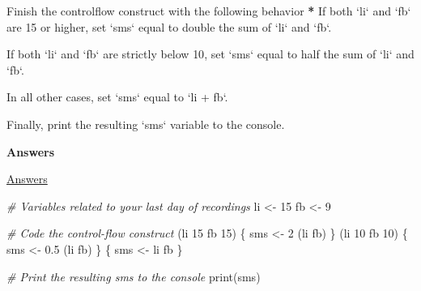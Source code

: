 \documentclass[]{article}
\newcommand{\hlnum}[1]{\textcolor[rgb]{0.816,0.125,0.439}{#1}}%
\newcommand{\hlstr}[1]{\textcolor[rgb]{0.251,0.627,0.251}{#1}}%
\newcommand{\hlcom}[1]{\textcolor[rgb]{0.502,0.502,0.502}{\textit{#1}}}%
\newcommand{\hlstd}[1]{\textcolor[rgb]{0.251,0.251,0.251}{#1}}%
\newcommand{\hlkwc}[1]{\textcolor[rgb]{0.251,0.251,0.251}{#1}}%
\newcommand{\hlkwd}[1]{\textcolor[rgb]{0.878,0.439,0.125}{#1}}%
\newenvironment{Shaded}{\begin{myshaded}}{\end{myshaded}}
\newcommand{\KeywordTok}[1]{\hlkwd{#1}}
\newcommand{\DataTypeTok}[1]{\hlkwc{#1}}
\newcommand{\DecValTok}[1]{\hlnum{#1}}
\newcommand{\FloatTok}[1]{\hlnum{#1}}
\newcommand{\StringTok}[1]{\hlstr{#1}}
\newcommand{\CommentTok}[1]{\hlcom{#1}}
\newcommand{\ErrorTok}[1]{\textbf{{#1}}}
\newcommand{\NormalTok}[1]{\hlstd{#1}}
\begin{document}
\begin{Shaded}
\begin{Highlighting}[]
\NormalTok{Finish the control}\OperatorTok{-}\NormalTok{flow construct with the following behavior}\OperatorTok{:}
\StringTok{  }
\StringTok{  }\ErrorTok{*}\StringTok{ }\NormalTok{If both }\StringTok{`}\DataTypeTok{li}\StringTok{`}\NormalTok{ and }\StringTok{`}\DataTypeTok{fb}\StringTok{`}\NormalTok{ are }\DecValTok{15}\NormalTok{ or higher, set }\StringTok{`}\DataTypeTok{sms}\StringTok{`}\NormalTok{ equal to double the sum of }\StringTok{`}\DataTypeTok{li}\StringTok{`}\NormalTok{ and }\StringTok{`}\DataTypeTok{fb}\StringTok{`}\NormalTok{.}

\OperatorTok{*}\StringTok{ }\NormalTok{If both }\StringTok{`}\DataTypeTok{li}\StringTok{`}\NormalTok{ and }\StringTok{`}\DataTypeTok{fb}\StringTok{`}\NormalTok{ are strictly below }\DecValTok{10}\NormalTok{, set }\StringTok{`}\DataTypeTok{sms}\StringTok{`}\NormalTok{ equal to half the sum of }\StringTok{`}\DataTypeTok{li}\StringTok{`}\NormalTok{ and }\StringTok{`}\DataTypeTok{fb}\StringTok{`}\NormalTok{.}

\OperatorTok{*}\StringTok{ }\NormalTok{In all other cases, set }\StringTok{`}\DataTypeTok{sms}\StringTok{`}\NormalTok{ equal to }\StringTok{`}\DataTypeTok{li + fb}\StringTok{`}\NormalTok{.}

\OperatorTok{*}\StringTok{ }\NormalTok{Finally, print the resulting }\StringTok{`}\DataTypeTok{sms}\StringTok{`}\NormalTok{ variable to the console.}
\end{Highlighting}
\end{Shaded}

\textbf{Answers}

\href{https://campus.datacamp.com/courses/intermediate-r/chapter-1-conditionals-and-control-flow?ex=16}{Answers}

\begin{Shaded}
\begin{Highlighting}[]
\CommentTok{# Variables related to your last day of recordings}
\NormalTok{li <-}\StringTok{ }\DecValTok{15}
\NormalTok{fb <-}\StringTok{ }\DecValTok{9}

\CommentTok{# Code the control-flow construct}
\NormalTok{ (li }\OperatorTok{>=}\StringTok{ }\DecValTok{15} \OperatorTok{&}\StringTok{ }\NormalTok{fb }\OperatorTok{>=}\StringTok{ }\DecValTok{15}\NormalTok{) \{}
\NormalTok{  sms <-}\StringTok{ }\DecValTok{2} \OperatorTok{*}\StringTok{ }\NormalTok{(li }\OperatorTok{+}\StringTok{ }\NormalTok{fb)}
\NormalTok{\} } \NormalTok{ (li }\OperatorTok{<}\StringTok{ }\DecValTok{10} \OperatorTok{&}\StringTok{ }\NormalTok{fb }\OperatorTok{<}\StringTok{ }\DecValTok{10}\NormalTok{) \{}
\NormalTok{  sms <-}\StringTok{ }\FloatTok{0.5} \OperatorTok{*}\StringTok{ }\NormalTok{(li }\OperatorTok{+}\StringTok{ }\NormalTok{fb)}
\NormalTok{\} }\NormalTok{ \{}
\NormalTok{  sms <-}\StringTok{ }\NormalTok{li }\OperatorTok{+}\StringTok{ }\NormalTok{fb}
\NormalTok{\}}

\CommentTok{# Print the resulting sms to the console}
\KeywordTok{print}\NormalTok{(sms)}
\end{Highlighting}
\end{Shaded}
\end{document}
